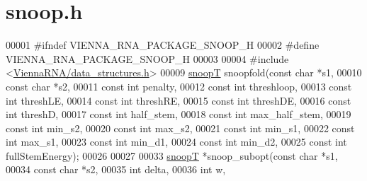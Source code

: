 \hypertarget{snoop_8h_source}{}\section{snoop.\+h}
\label{snoop_8h_source}

\begin{DoxyCode}
00001 \textcolor{preprocessor}{#ifndef VIENNA\_RNA\_PACKAGE\_SNOOP\_H}
00002 \textcolor{preprocessor}{#define VIENNA\_RNA\_PACKAGE\_SNOOP\_H}
00003 
00004 \textcolor{preprocessor}{#include <\hyperlink{data__structures_8h}{ViennaRNA/data\_structures.h}>}
00009 \hyperlink{group__data__structures_structsnoopT}{snoopT} snoopfold(\textcolor{keyword}{const} \textcolor{keywordtype}{char} *s1,
00010                  \textcolor{keyword}{const} \textcolor{keywordtype}{char} *s2,
00011                  \textcolor{keyword}{const} \textcolor{keywordtype}{int}  penalty,
00012                  \textcolor{keyword}{const} \textcolor{keywordtype}{int}  threshloop,
00013                  \textcolor{keyword}{const} \textcolor{keywordtype}{int}  threshLE,
00014                  \textcolor{keyword}{const} \textcolor{keywordtype}{int}  threshRE,
00015                  \textcolor{keyword}{const} \textcolor{keywordtype}{int}  threshDE,
00016                  \textcolor{keyword}{const} \textcolor{keywordtype}{int}  threshD,
00017                  \textcolor{keyword}{const} \textcolor{keywordtype}{int}  half\_stem,
00018                  \textcolor{keyword}{const} \textcolor{keywordtype}{int}  max\_half\_stem,
00019                  \textcolor{keyword}{const} \textcolor{keywordtype}{int}  min\_s2,
00020                  \textcolor{keyword}{const} \textcolor{keywordtype}{int}  max\_s2,
00021                  \textcolor{keyword}{const} \textcolor{keywordtype}{int}  min\_s1,
00022                  \textcolor{keyword}{const} \textcolor{keywordtype}{int}  max\_s1,
00023                  \textcolor{keyword}{const} \textcolor{keywordtype}{int}  min\_d1,
00024                  \textcolor{keyword}{const} \textcolor{keywordtype}{int}  min\_d2,
00025                  \textcolor{keyword}{const} \textcolor{keywordtype}{int}  fullStemEnergy);
00026 
00027 
00033 \hyperlink{group__data__structures_structsnoopT}{snoopT} *snoop\_subopt(\textcolor{keyword}{const} \textcolor{keywordtype}{char} *s1,
00034                      \textcolor{keyword}{const} \textcolor{keywordtype}{char} *s2,
00035                      \textcolor{keywordtype}{int}        delta,
00036                      \textcolor{keywordtype}{int}        w,

\end{DoxyCode}
